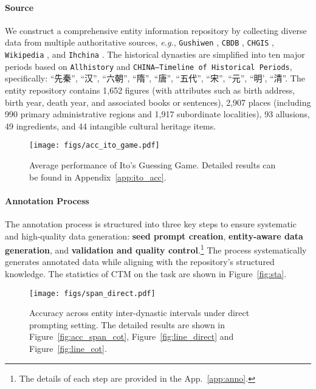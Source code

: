 \paragraph{Source}
We construct a comprehensive entity information repository by collecting diverse data from multiple authoritative sources, \textit{e.g.}, \texttt{Gushiwen}
, \texttt{CBDB}
, \texttt{CHGIS}
, \texttt{Wikipedia}
, and 
\texttt{Ihchina}
.
The historical dynasties are simplified into ten major periods based on \texttt{Allhistory} and \texttt{CHINA—Timeline of Historical Periods}, 
specifically: ``先秦'', ``汉'', ``六朝'', ``隋'', ``唐'', ``五代'', ``宋'', ``元'',  ``明', ``清''.
The entity repository contains 1,652 figures (with attributes such as birth address, birth year, death year, and associated books or sentences), 2,907 places (including 990 primary administrative regions and 1,917 subordinate localities), 93 allusions, 49 ingredients, and 44 intangible cultural heritage items.

\begin{figure}[t]
    \centering
    \texttt{[image: figs/acc\_ito\_game.pdf]}
    \caption{Average performance of Ito's Guessing Game. Detailed results can be found in Appendix~\ref{app:ito_acc}.
    }
    \label{fig:ito}
    \vspace{-5mm}
\end{figure}

\paragraph{Annotation Process}
The annotation process is structured into three key steps to ensure systematic and high-quality data generation:
\textbf{seed prompt creation}, \textbf{entity-aware data generation}, and \textbf{validation and quality control}.\footnote{The details of each step are provided in the App.~\ref{app:anno}.}
The process systematically generates annotated data while aligning with the repository's structured knowledge.
The statistics of CTM on the task are shown in Figure~\ref{fig:sta}.



\begin{figure*}[t]
    \centering
    \texttt{[image: figs/span\_direct.pdf]}
    \caption{Accuracy across entity inter-dynastic intervals under direct prompting setting. 
    The detailed results are shown in Figure~\ref{fig:acc_span_cot}, Figure~\ref{fig:line_direct} and Figure~\ref{fig:line_cot}.
    }
    \label{fig:acc_span}
\end{figure*}

